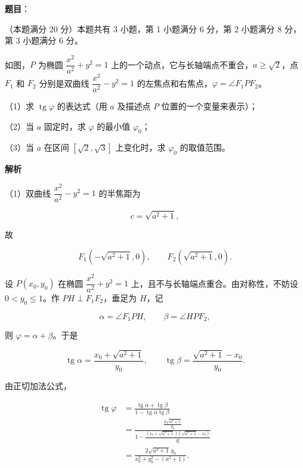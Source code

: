 \begin{answer}

\textbf{题目}：

（本题满分 20 分）本题共有 3 小题，第 1 小题满分 6 分，第 2 小题满分 8 分，第 3 小题满分 6 分。

如图，$P$ 为椭圆 $\dfrac{x^2}{a^2}+y^2=1$ 上的一个动点，它与长轴端点不重合，$a\ge\sqrt2$，点 $F_1$ 和 $F_2$ 分别是双曲线 $\dfrac{x^2}{a^2}-y^2=1$ 的左焦点和右焦点，$\varphi=\angle F_1PF_2$。

（1）求 $\operatorname{tg}\varphi$ 的表达式（用 $a$ 及描述点 $P$ 位置的一个变量来表示）；

（2）当 $a$ 固定时，求 $\varphi$ 的最小值 $\varphi_0$；

（3）当 $a$ 在区间 $[\sqrt2,\sqrt3]$ 上变化时，求 $\varphi_0$ 的取值范围。
\nopagebreak[4]
\begin{center}\end{center}
\nopagebreak[4]
\textbf{解析}

（1）双曲线 $\dfrac{x^2}{a^2}-y^2=1$ 的半焦距为

\nopagebreak[4]
\[
c=\sqrt{a^2+1},
\]

故

\nopagebreak[4]
\[
F_1\left(-\sqrt{a^2+1},0\right),\qquad
F_2\left(\sqrt{a^2+1},0\right).
\]

设 $P(x_0,y_0)$ 在椭圆 $\dfrac{x^2}{a^2}+y^2=1$ 上，且不与长轴端点重合。由对称性，不妨设 $0<y_0\le1$。作 $PH\perp F_1F_2$，垂足为 $H$，记

\nopagebreak[4]
\[
\alpha=\angle F_1PH,\qquad \beta=\angle HPF_2,
\]

则 $\varphi=\alpha+\beta$。于是

\nopagebreak[4]
\[
\operatorname{tg}\alpha=\frac{x_0+\sqrt{a^2+1}}{y_0},
\qquad
\operatorname{tg}\beta=\frac{\sqrt{a^2+1}-x_0}{y_0}.
\]

由正切加法公式，

\nopagebreak[4]
\[
\begin{aligned}
\operatorname{tg}\varphi
&=\frac{\operatorname{tg}\alpha+\operatorname{tg}\beta}
{1-\operatorname{tg}\alpha\operatorname{tg}\beta}\\
&=\frac{\frac{2\sqrt{a^2+1}}{y_0}}
{1-\frac{(x_0+\sqrt{a^2+1})(\sqrt{a^2+1}-x_0)}{y_0^2}}\\
&=\frac{2\sqrt{a^2+1}\,y_0}
{x_0^2+y_0^2-(a^2+1)}.
\end{aligned}
\]


\end{answer}
